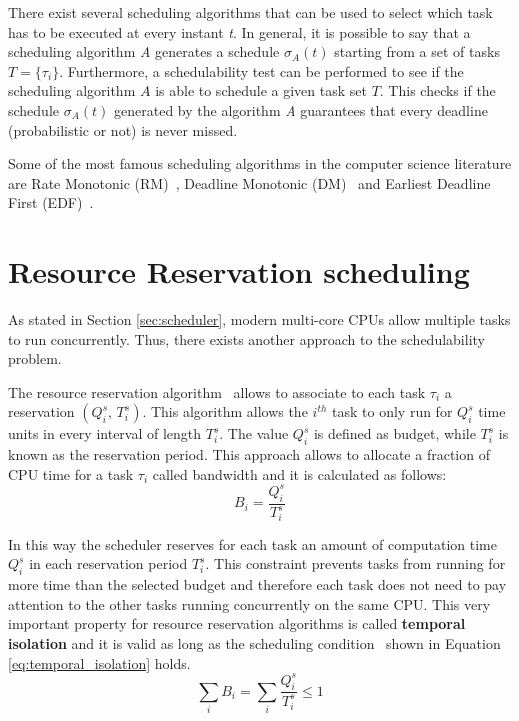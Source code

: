 There exist several scheduling algorithms that can be used to select which task 
has to be executed at every instant \emph{t}. In general, it is
possible to say that a scheduling algorithm \emph{A} generates a schedule
\( \sigma_{A}\left(t\right) \) starting from a set of tasks \( T = \{\tau_{i}\} \).
Furthermore, a schedulability test can be performed to see if the scheduling
algorithm \( A \) is able to schedule a given task set \( T \). This checks
if the schedule \( \sigma_{A}\left(t\right) \) generated by the algorithm \emph{A}
guarantees that every deadline (probabilistic or not) is never missed.

Some of the most famous scheduling algorithms in the computer science literature
are Rate Monotonic (RM)~\cite{lehoczky1989rate}, Deadline Monotonic
(DM)~\cite{audsley1991hard} and Earliest Deadline First (EDF)~\cite{jansen2003lightweight}.


\section{Resource Reservation scheduling}
As stated in Section \ref{sec:scheduler}, modern multi-core CPUs allow multiple
tasks to run concurrently. Thus, there exists another approach to the schedulability
problem.

The resource reservation algorithm~\cite{abeni1998integrating} allows to associate to each task 
\( \tau_{i} \) a reservation \( \left(Q_{i}^s,\,T_{i}^s\right) \).
This algorithm allows the \( i^{th} \) task to only run for \( Q_{i}^s \) time units 
in every interval of length \( T_{i}^s \). The value \( Q_{i}^s \) is defined as
budget, while \( T_{i}^s \) is known as the reservation period.
This approach allows to allocate a fraction of CPU time for a task \( \tau_{i} \)
called bandwidth and it is calculated as follows:
\begin{equation}
    B_{i} = \frac{Q_{i}^s}{T_{i}^s}
\end{equation}

In this way the scheduler reserves for each task an amount of computation
time \( Q_{i}^s \) in each reservation period \( T_{i}^s \). This constraint
prevents tasks from running for more time than the selected budget and
therefore each task does not need to pay attention to the other tasks running
concurrently on the same CPU. This very important property for resource reservation algorithms is called
\textbf{temporal isolation} and it is valid as long as the scheduling
condition~\cite{lee2007handbook} shown in Equation \ref{eq:temporal_isolation} 
holds.
\begin{equation} \label{eq:temporal_isolation}
    \displaystyle\sum_{i} B_{i} =  \displaystyle\sum_{i} \frac{Q_{i}^s}{T_{i}^s} \leq 1
\end{equation}


